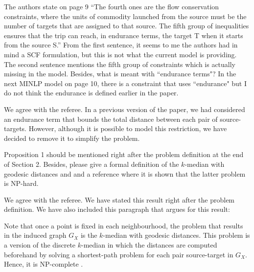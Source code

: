 \documentclass{article}
\newenvironment{reviewer}{\setcounter{pointcounter}{1}}{}
\newcommand{\point}{\text{{\selectfont \thepointcounter} \stepcounter{pointcounter}}}
\begin{document}
\begin{reviewer}
		\begin{itshape}
			The authors state on page 9 ``The fourth ones are the flow conservation constraints, where the units of commodity launched from the source must be the number of targets that are assigned to that source. The fifth group of inequalities ensures that the trip can reach, in endurance terms, the target T when it starts from the source S.'' From the first sentence, it seems to me the authors had in mind a SCF formulation, but this is not what the current model is providing. The second sentence mentions the fifth group of constraints which is actually missing in the model. Besides, what is meant with ``endurance terms"? In the next MINLP model on page 10, there is a constraint that uses ``endurance" but I do not think the endurance is defined earlier in the paper.
		\end{itshape}
		
		\begin{tcolorbox}[breakable,enhanced,coltitle=black,colback=green!5!white,colframe=green!75!black,title=\textbf{Answer R2.\point},borderline={1pt}{0pt}{black},boxrule=0pt]
			We agree with the referee. In a previous version of the paper, we had considered an endurance term that bounds the total distance between each pair of source-targets. However, although it is possible to model this restriction, we have decided to remove it to simplify the problem.
		\end{tcolorbox}
		
		\begin{itshape}
			Proposition 1 should be mentioned right after the problem definition at the end of Section 2. Besides, please give a formal definition of the $k$-median with geodesic distances and and a reference where it is shown that the latter problem is NP-hard.
		\end{itshape}
		
		\begin{tcolorbox}[breakable,enhanced,coltitle=black,colback=green!5!white,colframe=green!75!black,title=\textbf{Answer R2.\point},borderline={1pt}{0pt}{black},boxrule=0pt]
			We agree with the referee. We have stated this result right after the problem definition. We have also included this paragraph that argues for this result:
			
			\medskip
			
			Note that once a point is fixed in each neighbourhood, the problem that results in the induced graph $G_X$ is the $k$-median with geodesic distances. This problem is a version of the discrete $k$-median in which the distances are computed beforehand by solving a shortest-path problem for each pair source-target in $G_X$. Hence, it is NP-complete \citep{kariv1979}.
		\end{tcolorbox}
		


\end{reviewer}
\end{document}

